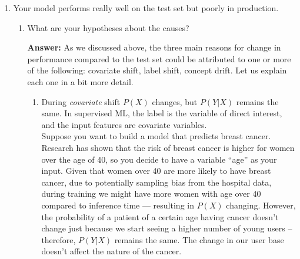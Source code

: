 \documentclass{article}
\newenvironment{QandA}{\begin{enumerate}[label=\arabic*.]}{\end{enumerate}}
\newenvironment{InnerQandA}{\begin{enumerate}[label=\roman*.]}{\end{enumerate}}
\newenvironment{ListAlph}{\begin{enumerate}[label=(\alph*)]}{\end{enumerate}}
\newenvironment{answer}{\par\normalfont \textbf{Answer:}}{}
\newcommand{\g}{\vert}
\begin{document}
\begin{QandA}
\begin{answer}
\begin{ListAlph}
            \item \textit{Bias}. One should do extensive testing and model validation to confirm that the model doesn't perpetuate potential biases that can occur in the training data, such as racial and gender stereotypes. Moreover, it's important to design post-hoc safety systems that prevent users with malicious intents.
        \end{ListAlph}

        (Source: \href{https://huyenchip.com/machine-learning-systems-design/design-a-machine-learning-system.html#serving-091rIYw}{Chip Huyen's ML system design interview booklet})
    \end{answer}

    
    \item Your model performs really well on the test set but poorly in production.
    \begin{InnerQandA}
        \item What are your hypotheses about the causes?
        \begin{answer}
            As we discussed above, the three main reasons for change in performance compared to the test set could be attributed to one or more of the following: covariate shift, label shift, concept drift. Let us explain each one in a bit more detail.
            
            \begin{ListAlph}

            \item During \textit{covariate} shift $P(X)$ changes, but $P(Y \g X)$ remains the same. In supervised ML, the label is the variable of direct interest, and the input features are covariate variables. \\

            Suppose you want to build a model that predicts breast cancer. Research has shown that the risk of breast cancer is higher for women over the age of 40, so you decide to have a variable “age” as your input. Given that women over 40 are more likely to have breast cancer,  due to potentially sampling bias from the hospital data, during training we might have more women with age over 40 compared to inference time — resulting in $P(X)$ changing. However, the probability of a patient of a certain age having cancer doesn't change just because we start seeing a higher number of young users -- therefore, $P(Y \g X)$ remains the same. The change in our user base doesn't affect the nature of the cancer. \\
        

\end{ListAlph}
\end{answer}
\end{InnerQandA}
\end{QandA}
\end{document}
